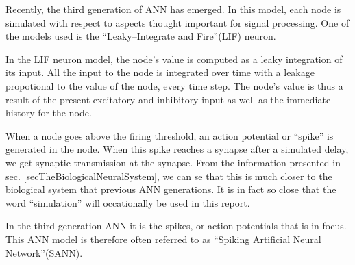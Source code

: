 %
%

Recently, the third generation of ANN has emerged. In this model, each node is simulated with respect to aspects thought important for signal processing\cite{Maass97networksof}.
One of the models used is the ``Leaky--Integrate and Fire''(LIF) neuron. %

In the LIF neuron model, the node's value is computed as a leaky integration of its input. %
All the input to the node is integrated over time with a leakage propotional to the value of the node, every time step.
The node's value is thus a result of the present excitatory and inhibitory input as well as the immediate history for the node.

When a node goes above the firing threshold, an action potential or ``spike'' is generated in the node. 
When this spike reaches a synapse after a simulated delay, we get synaptic transmission at the synapse.
From the information presented in sec. \ref{secTheBiologicalNeuralSystem}, we can se that this is much closer to the biological system that previous ANN generations.
It is in fact so close that the word ``simulation'' will occationally be used in this report.

In the third generation ANN it is the spikes, or action potentials that is in focus. %
This ANN model is therefore often referred to as ``Spiking Artificial Neural Network''(SANN).



